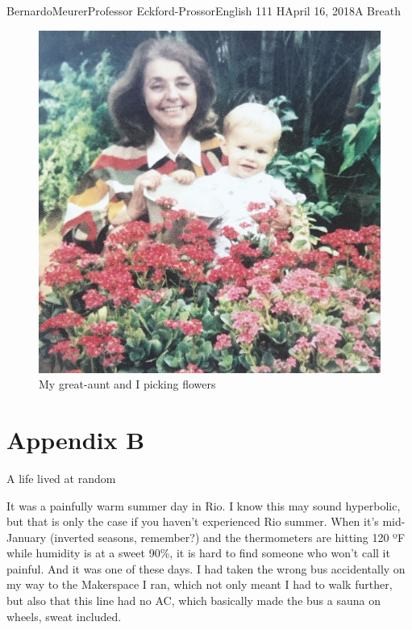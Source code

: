 \documentclass[12pt,letterpaper]{article}
\begin{document}
\begin{mla}{Bernardo}{Meurer}{Professor Eckford-Prossor}{English 111 H}{April 16, 2018}{A Breath}
	\newpage
	\vspace*{\fill}
	\begin{figure}[H]
		\centering
		\includegraphics[width=\linewidth]{flowers-2.jpg}
		\caption{My great-aunt and I picking flowers}
	\end{figure}
	\vspace*{\fill}
	\newpage

	\section*{Appendix B}
	\begin{center}
		A life lived at random
	\end{center}
	\tab{} It was a painfully warm summer day in Rio. I know this may sound hyperbolic, but that is only the case if you haven't experienced Rio summer. When it's mid-January (inverted seasons, remember?) and the thermometers are hitting 120 ºF while humidity is at a sweet 90\%, it is hard to find someone who won't call it painful. And it was one of these days. I had taken the wrong bus accidentally on my way to the Makerspace I ran, which not only meant I had to walk further, but also that this line had no AC, which basically made the bus a sauna on wheels, sweat included.


\end{mla}
\end{document}

